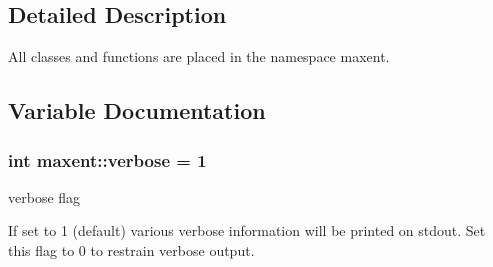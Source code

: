 \subsection{Detailed Description}
All classes and functions are placed in the namespace maxent. 

\subsection{Variable Documentation}
\subsubsection{\setlength{\rightskip}{0pt plus 5cm}int {\bf maxent::verbose} = 1}\label{namespacemaxent_a0}


verbose flag 

If set to 1 (default) various verbose information will be printed on stdout. Set this flag to 0 to restrain verbose output. 